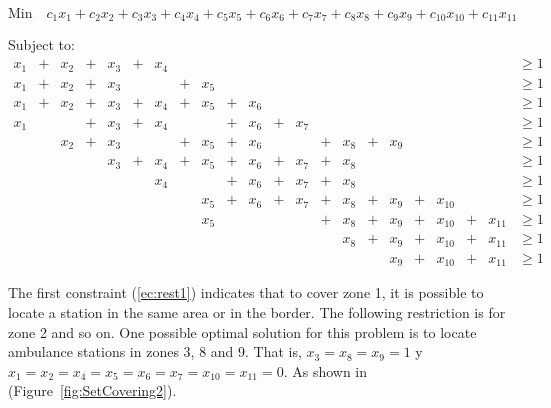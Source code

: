 \scriptsize
\begin{equation} \label{ec:SetCoveringExample} 
\mbox{Min} \quad c_{1}x_{1} + c_{2}x_{2} + c_{3}x_{3} + c_{4}x_{4} + c_{5}x_{5} + c_{6}x_{6} + c_{7}x_{7} + c_{8}x_{8} + c_{9}x_{9} + c_{10}x_{10} + c_{11}x_{11}
\end{equation}

Subject to:
\begin{align}
x_{1} & + & x_{2} & + & x_{3} & + & x_{4} &  &  &  &  &  &  &  &  &  &  &  &  &  &  & \geq  1 \label{ec:rest1}  \\
x_{1} & + & x_{2} & + & x_{3} &  &  & + & x_{5} &  &  &  &  &  &  &  &  &  &  &  &  & \geq  1 \\
x_{1} & + & x_{2} & + & x_{3} & + & x_{4} & + & x_{5} & + & x_{6} &  &  &  &  &  &  &  &  &  &  & \geq  1 \\
x_{1} &  &  & + & x_{3} & + & x_{4} &  &  & + & x_{6} & + & x_{7} &  &  &  &  &  &  &  &  & \geq  1 \\
& & x_{2} & + & x_{3} &  &  & + & x_{5} & + & x_{6} &  &  & + & x_{8} & + & x_{9} &  &  &  &  & \geq  1 \\
& & & & x_{3} & + & x_{4} & + & x_{5} & + & x_{6} & + & x_{7} & + & x_{8} &  &  &  &  &  &  & \geq  1 \\
& & & & & & x_{4} & & & + & x_{6} & + & x_{7} & + & x_{8} & & & & & & & \geq  1 \\
& & & & & & & & x_{5} & + & x_{6} & + & x_{7} & + & x_{8} & + & x_{9} & + & x_{10} & & & \geq  1 \\
& & & & & & & & x_{5} & & & & & + & x_{8} & + & x_{9} & + & x_{10} & + & x_{11} & \geq  1 \\
& & & & & & & & & & & & & & x_{8} & + & x_{9} & + & x_{10} & + & x_{11} & \geq  1 \\
& & & & & & & & & & & & & & & & x_{9} & + & x_{10} & + & x_{11} & \geq  1 
\end{align}
\normalsize

The first constraint (\ref{ec:rest1}) indicates that to cover zone 1, it is possible to locate a station in the same area or in the border. The following restriction is for zone 2 and so on. One possible optimal solution for this problem is to locate ambulance stations in zones 3, 8 and 9. That is, $x_{3} = x_8 = x_9 = 1$ y $x_{1} = x_{2} = x_{4} = x_{5} = x_{6} = x_{7} = x_{10} = x_{11} = 0$. As shown in (Figure~\ref{fig:SetCovering2}).

